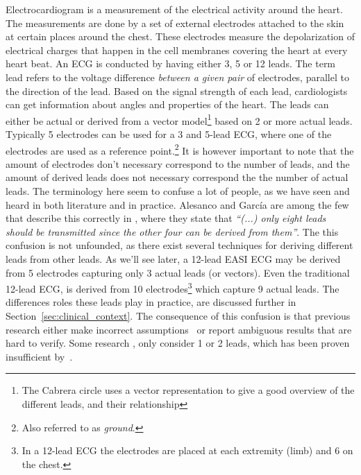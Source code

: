 Electrocardiogram is a measurement of the electrical activity around the heart. The measurements are done by a set of external electrodes attached to the skin at certain places around the chest. These electrodes measure the depolarization of electrical charges that happen in the cell membranes covering the heart at every heart beat. An ECG is conducted by having either 3, 5 or 12 leads. The term lead refers to the voltage difference \textit{between a given pair} of electrodes, parallel to the direction of the lead. Based on the signal strength of each lead, cardiologists can get information about angles and properties of the heart. The leads can either be actual or derived from a vector model\footnote{ The Cabrera circle uses a vector representation to give a good overview of the different leads, and their relationship} based on 2 or more actual leads. Typically 5 electrodes can be used for a 3 and 5-lead ECG, where one of the electrodes are used as a reference point.\footnote{ Also referred to as \emph{ground}.} It is however important to note that the amount of electrodes don't necessary correspond to the number of leads, and the amount of derived leads does not necessary correspond the the number of actual leads. The terminology here seem to confuse a lot of people, as we have seen and heard in both literature and in practice. Alesanco and García are among the few that describe this correctly in \cite{Alesanco:2010kc}, where they state that \textit{``(...) only eight leads should be transmitted since the other four can be derived from them''}. The this confusion is not unfounded, as there exist several techniques for deriving different leads from other leads. As we'll see later, a 12-lead EASI ECG may be derived from 5 electrodes capturing only 3 actual leads (or vectors). Even the traditional 12-lead ECG, is derived from 10 electrodes\footnote{ In a 12-lead ECG the electrodes are placed at each extremity (limb) and 6 on the chest.} which capture 9 actual leads. The differences roles these leads play in practice, are discussed further in Section~\ref{sec:clinical_context}. The consequence of this confusion is that previous research either make incorrect assumptions~\cite{jenniferporcello:2015wv} or report ambiguous results that are hard to verify. Some research \cite{yubin:2012tr, Lee:2009bu, Alesanco:2010kc}, only consider 1 or 2 leads, which has been proven insufficient by~\cite{Drew:1998wp}.

